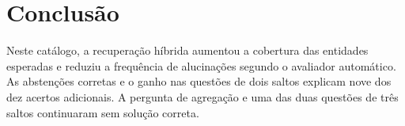 \documentclass[12pt]{article}
\begin{document}
\section{Conclusão}
Neste catálogo, a recuperação híbrida aumentou a cobertura das entidades esperadas e reduziu a frequência de alucinações segundo o avaliador automático. As abstenções corretas e o ganho nas questões de dois saltos explicam nove dos dez acertos adicionais. A pergunta de agregação e uma das duas questões de três saltos continuaram sem solução correta.



\end{document}
